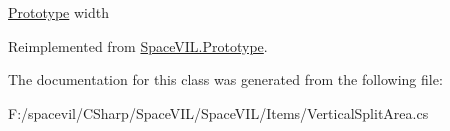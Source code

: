 \mbox{\hyperlink{class_space_v_i_l_1_1_prototype}{Prototype}} width 



Reimplemented from \mbox{\hyperlink{class_space_v_i_l_1_1_prototype_a6a4f1b9581f4d18f1c3a3e287d4b2a2b}{Space\+V\+I\+L.\+Prototype}}.



The documentation for this class was generated from the following file\+:\begin{DoxyCompactItemize}
\item 
F\+:/spacevil/\+C\+Sharp/\+Space\+V\+I\+L/\+Space\+V\+I\+L/\+Items/Vertical\+Split\+Area.\+cs\end{DoxyCompactItemize}
